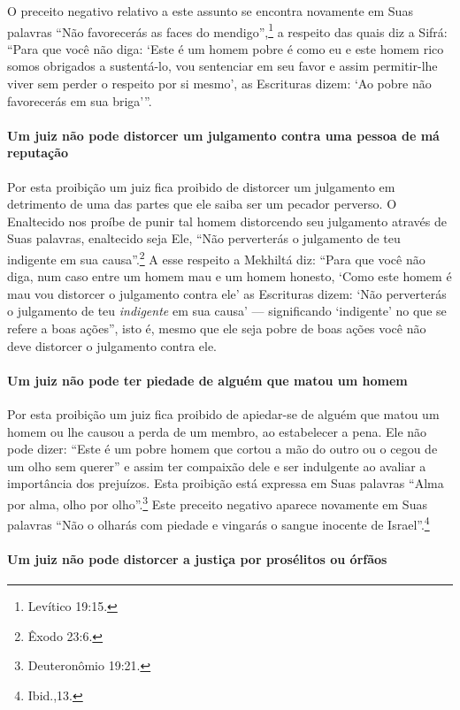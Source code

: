 O preceito negativo relativo a este assunto se encontra novamente em
Suas palavras ``Não favorecerás as faces do mendigo'',\footnote{Levítico 19:15.}
a respeito das quais diz a Sifrá: ``Para que você não diga: `Este é um
homem pobre é como eu e este homem rico somos obrigados a sustentá-lo,
vou sentenciar em seu favor e assim permitir-lhe viver sem perder o
respeito por si mesmo', as Escrituras dizem: `Ao pobre não favorecerás
em sua briga'''.

\paragraph{Um juiz não pode distorcer um julgamento contra uma pessoa de má reputação}

Por esta proibição um juiz fica proibido de distorcer um julgamento em
detrimento de uma das partes que ele saiba ser um pecador perverso. O
Enaltecido nos proíbe de punir tal homem distorcendo seu julgamento
através de Suas palavras, enaltecido seja Ele, ``Não perverterás o
julgamento de teu indigente em sua causa''.\footnote{Êxodo 23:6.} A esse
respeito a Mekhiltá diz: ``Para que você não diga, num caso entre um
homem mau e um homem honesto, `Como este homem é mau vou distorcer o
julgamento contra ele' as Escrituras dizem: `Não perverterás o
julgamento de teu \emph{indigente} em sua causa' --- significando
`indigente' no que se refere a boas ações'', isto é, mesmo que ele seja
pobre de boas ações você não deve distorcer o julgamento contra ele.

\paragraph{Um juiz não pode ter piedade de alguém que matou um homem}

Por esta proibição um juiz fica proibido de apiedar-se de alguém que
matou um homem ou lhe causou a perda de um membro, ao estabelecer a
pena. Ele não pode dizer: ``Este é um pobre homem que cortou a mão do
outro ou o cegou de um olho sem querer'' e assim ter compaixão dele e
ser indulgente ao avaliar a importância dos prejuízos. Esta proibição
está expressa em Suas palavras ``Alma por alma, olho por olho''.\footnote{Deuteronômio 19:21.} Este preceito negativo aparece novamente em Suas
palavras ``Não o olharás com piedade e vingarás o sangue inocente de
Israel''.\footnote{Ibid.,13.}

\paragraph{Um juiz não pode distorcer a justiça por prosélitos ou órfãos}

